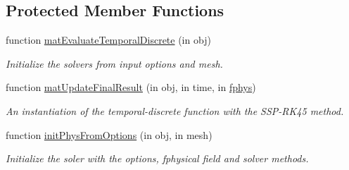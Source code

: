 \subsection*{Protected Member Functions}
\begin{DoxyCompactItemize}
\item 
function \hyperlink{class_ndg_phys_mat_a091ab444f15a9137c50f1d040f64deea}{mat\+Evaluate\+Temporal\+Discrete} (in obj)
\begin{DoxyCompactList}\small\item\em Initialize the solvers from input options and mesh. \end{DoxyCompactList}\item 
function \hyperlink{class_ndg_phys_mat_a7f3d8aa2329034a21a89e2dd90e7036a}{mat\+Update\+Final\+Result} (in obj, in time, in \hyperlink{class_ndg_phys_a6b25724fc9474d32018439009072f0a9}{fphys})
\begin{DoxyCompactList}\small\item\em An instantiation of the temporal-\/discrete function with the S\+S\+P-\/\+R\+K45 method. \end{DoxyCompactList}\item 
function \hyperlink{class_ndg_phys_mat_a961e7fc950e981806ac00a02e7fbc1c8}{init\+Phys\+From\+Options} (in obj, in mesh)
\begin{DoxyCompactList}\small\item\em Initialize the soler with the options, fphysical field and solver methods. \end{DoxyCompactList}\end{DoxyCompactItemize}
